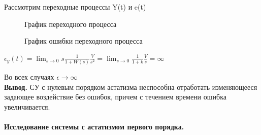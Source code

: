 \documentclass[a4paper, 11pt]{article}
\begin{document}
Рассмотрим переходные процессы Y(t) и e(t)

\begin{figure}[h!]
    \caption{График переходного процесса}
    \label{four}
\end{figure}

\begin{figure}[h!]
    \caption{График ошибки переходного процесса}
    \label{tree}
\end{figure}

$\epsilon_y(t)=\lim_{s\to0}s\frac{1}{1+W(s)}\frac{V}{s^2}=\lim_{s\to0}\frac{1}{1+k}\frac{V}{s}=\infty$

Во всех случаях $\epsilon\to\infty$ \\

\textbf{Вывод.} СУ с нулевым порядком астатизма неспособна отработать изменяющееся задающее воздействие без ошибок, причем с течением времени ошибка увеличивается.
\newpage
\paragraph{Исследование системы с астатизмом первого порядка.}
\end{document}
